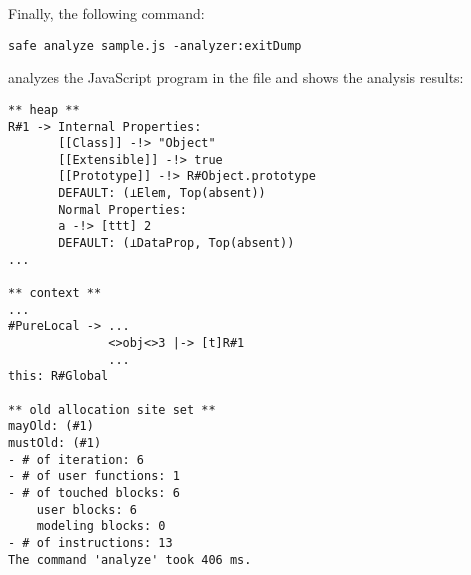 \noindent
Finally, the following command:
\begin{verbatim}
safe analyze sample.js -analyzer:exitDump
\end{verbatim}
analyzes the JavaScript program in the file and shows the analysis results:
{\small
\begin{verbatim}
** heap **
R#1 -> Internal Properties:
       [[Class]] -!> "Object"
       [[Extensible]] -!> true
       [[Prototype]] -!> R#Object.prototype
       DEFAULT: (⊥Elem, Top(absent))
       Normal Properties:
       a -!> [ttt] 2
       DEFAULT: (⊥DataProp, Top(absent))
...

** context **
...
#PureLocal -> ...
              <>obj<>3 |-> [t]R#1
              ...
this: R#Global

** old allocation site set **
mayOld: (#1)
mustOld: (#1)
- # of iteration: 6
- # of user functions: 1
- # of touched blocks: 6
    user blocks: 6
    modeling blocks: 0
- # of instructions: 13
The command 'analyze' took 406 ms.
\end{verbatim}
}
